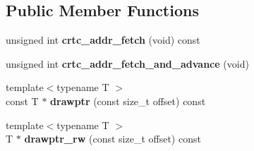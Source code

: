 \subsection*{Public Member Functions}
\begin{DoxyCompactItemize}
\item 
\hypertarget{structVGA__Experimental__Model__1__t_aa080df7a1bbfcc45bf9afb8cff0a8b6f}{unsigned int {\bfseries crtc\-\_\-addr\-\_\-fetch} (void) const }\label{structVGA__Experimental__Model__1__t_aa080df7a1bbfcc45bf9afb8cff0a8b6f}

\item 
\hypertarget{structVGA__Experimental__Model__1__t_a37937631034c9687fa2d7036a1b82480}{unsigned int {\bfseries crtc\-\_\-addr\-\_\-fetch\-\_\-and\-\_\-advance} (void)}\label{structVGA__Experimental__Model__1__t_a37937631034c9687fa2d7036a1b82480}

\item 
\hypertarget{structVGA__Experimental__Model__1__t_a73cd5607c3d7e37f8719709c7cda5cf5}{{\footnotesize template$<$typename T $>$ }\\const T $\ast$ {\bfseries drawptr} (const size\-\_\-t offset) const }\label{structVGA__Experimental__Model__1__t_a73cd5607c3d7e37f8719709c7cda5cf5}

\item 
\hypertarget{structVGA__Experimental__Model__1__t_ab7452d4ca3e85048f9caea609bd5fbb1}{{\footnotesize template$<$typename T $>$ }\\T $\ast$ {\bfseries drawptr\-\_\-rw} (const size\-\_\-t offset) const }\label{structVGA__Experimental__Model__1__t_ab7452d4ca3e85048f9caea609bd5fbb1}

\end{DoxyCompactItemize}
